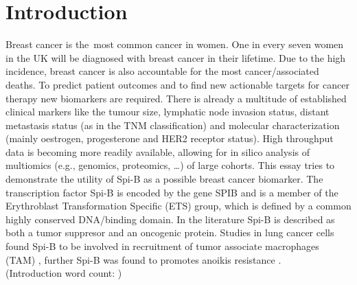 \section{Introduction}
\countem

Breast cancer is the\ most common cancer in women.
One in every seven women in the UK will be diagnosed with breast cancer in their lifetime. 
Due to the high incidence, breast cancer is also accountable for the most cancer\-/associated deaths.
To predict patient outcomes and to find new actionable targets for cancer therapy new biomarkers are required.
There is already a multitude of established clinical markers like the tumour size, lymphatic node invasion status, distant metastasis status (as in the TNM classification) and molecular characterization (mainly oestrogen, progesterone and HER2 receptor status).
High throughput data is becoming more readily available, allowing for in silico analysis of multiomics (e.g., genomics, proteomics, \ldots) of large cohorts.
This essay tries to demonstrate the utility of Spi-B as a possible breast cancer biomarker.
The transcription factor Spi-B is encoded by the gene SPIB and is a member of the Erythroblast Transformation Specific (ETS) group, which is defined by a common highly conserved DNA\-/binding domain.
In the literature Spi-B is described as both a tumor suppresor and an oncogenic protein.
Studies in lung cancer cells found Spi-B to be involved in recruitment of tumor associate macrophages (TAM) \cite{Huang2021}, further Spi-B was found to promotes anoikis resistance \cite{Zhang2020}.
\endcountem \\
(Introduction word count: \thewordcount{})